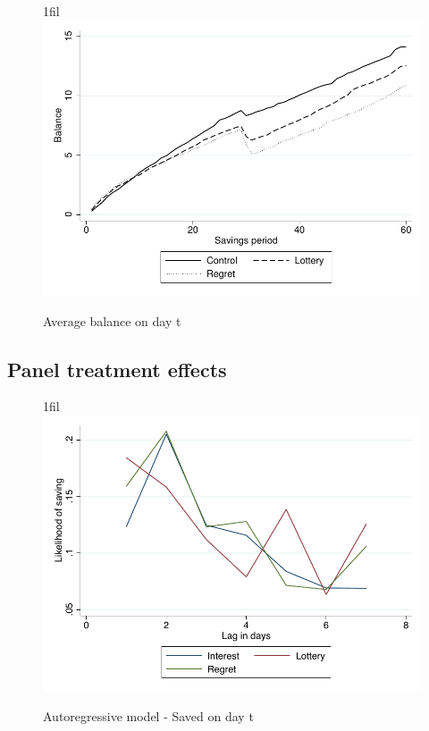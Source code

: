 \documentclass[10pt]{article}
\makeatletter
\newcommand*{\centerfloat}{%
  \parindent \z@
  \leftskip \z@ \@plus 1fil \@minus \textwidth
  \rightskip\leftskip
  \parfillskip \z@skip}
\makeatother
\begin{document}
		\begin{figure}[!htb]
		\centering
		\caption{Average balance on day t}
		\centerfloat
		\includegraphics{../../figures/line-balance.pdf}
		\end{figure}

	\clearpage

	\subsection{Panel treatment effects}

		\begin{figure}[!htb]
		\centering
		\caption{Autoregressive model - Saved on day t}
		\centerfloat
		\includegraphics{../../figures/line-ar.pdf}
		\end{figure}
\end{document}
